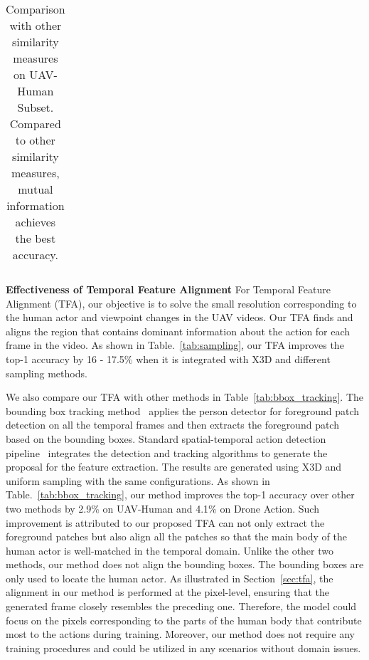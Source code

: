 \documentclass[10pt,twocolumn,letterpaper]{article}
\begin{document}
{\begin{table}
\begin{tabular}{c c }
\bottomrule
\end{tabular}
\vspace{-7pt}
\caption{Comparison with other similarity measures on UAV-Human Subset. Compared to other similarity measures, mutual information achieves the best accuracy.}
\vspace{-8pt}
\label{tab:similarity}
\end{table} \textbf{Effectiveness of Temporal Feature Alignment} For Temporal Feature Alignment (TFA), our objective is to solve the small resolution corresponding to the human actor and viewpoint changes in the UAV videos. 
Our TFA finds and aligns the region that contains dominant information about the action for each frame in the video. As shown in Table.~\ref{tab:sampling}, our TFA improves the top-1 accuracy by 16 - 17.5\% when it is integrated with X3D and different sampling methods.

We also compare our TFA with other methods in Table~\ref{tab:bbox_tracking}. The bounding box tracking method~\cite{demir2021tinyvirat} applies the person detector for foreground patch detection on all the temporal frames and then extracts the foreground patch based on the bounding boxes. Standard spatial-temporal action detection pipeline~\cite{liu2020argus} integrates the detection and tracking algorithms to generate the proposal for the feature extraction. The results are generated using X3D and uniform sampling with the same configurations. As shown in Table.~\ref{tab:bbox_tracking}, our method improves the top-1 accuracy over other two methods by 2.9\% on UAV-Human and 4.1\% on Drone Action. Such improvement is attributed to our proposed TFA can not only extract the foreground patches but also align all the patches so that the main body of the human actor is well-matched in the temporal domain. Unlike the other two methods, our method does not align the bounding boxes. The bounding boxes are only used to locate the human actor. As illustrated in Section~\ref{sec:tfa}, the alignment in our method is performed at the pixel-level, ensuring that the generated frame closely resembles the preceding one. Therefore, the model could focus on the pixels corresponding to the parts of the human body that contribute most to the actions during training. Moreover, our method does not require any training procedures and could be utilized in any scenarios without domain issues.


}
\end{document}
